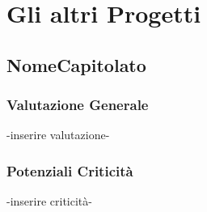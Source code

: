 \section{Gli altri Progetti}
  \subsection{NomeCapitolato}
    \subsubsection{Valutazione Generale}
      -inserire valutazione-
    \subsubsection{Potenziali Criticità}
     -inserire criticità-

